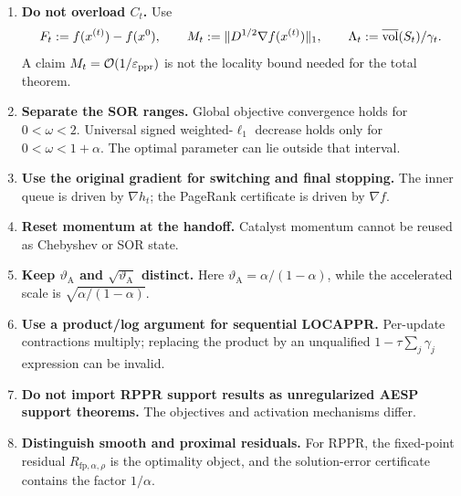 \begin{enumerate}[leftmargin=2.2em]
  \item \textbf{Do not overload $C_t$.} Use
        \[
          F_t:=f(x^{(t)})-f(x^0),
          \qquad
          M_t:=\lVert D^{1/2}\nabla f(x^{(t)})\rVert_1,
          \qquad
          \Lambda_t:=\overline{\operatorname{vol}}(S_t)/\gamma_t.
        \]
        A claim $M_t=\mathcal{O}(1/\varepsilon_{\mathrm{ppr}})$ is not the locality bound needed for the
        total theorem.
  \item \textbf{Separate the SOR ranges.} Global objective convergence holds
        for $0<\omega<2$. Universal signed weighted-$\ell_1$ decrease holds
        only for $0<\omega<1+\alpha$. The optimal parameter can lie outside
        that interval.
  \item \textbf{Use the original gradient for switching and final stopping.}
        The inner queue is driven by $\nabla h_t$; the PageRank certificate is
        driven by $\nabla f$.
  \item \textbf{Reset momentum at the handoff.} Catalyst momentum cannot be
        reused as Chebyshev or SOR state.
  \item \textbf{Keep $\vartheta_{\mathrm A}$ and $\sqrt{\vartheta_{\mathrm A}}$ distinct.}
        Here $\vartheta_{\mathrm A}=\alpha/(1-\alpha)$, while the accelerated scale is
        $\sqrt{\alpha/(1-\alpha)}$.
  \item \textbf{Use a product/log argument for sequential LOCAPPR.} Per-update
        contractions multiply; replacing the product by an unqualified
        $1-\tau\sum_j\gamma_j$ expression can be invalid.
  \item \textbf{Do not import RPPR support results as unregularized AESP
        support theorems.} The objectives and activation mechanisms differ.
  \item \textbf{Distinguish smooth and proximal residuals.} For RPPR, the
        fixed-point residual $R_{\mathrm{fp},\alpha,\rho}$ is the optimality object, and the
        solution-error certificate contains the factor $1/\alpha$.
\end{enumerate}
